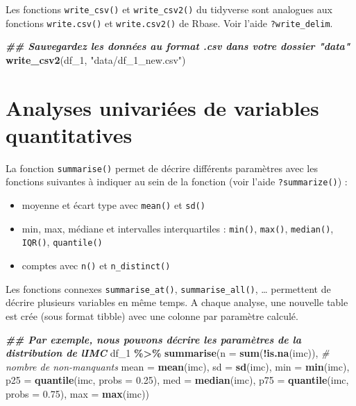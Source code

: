 \documentclass[
]{book}
\newenvironment{Shaded}{\begin{snugshade}}{\end{snugshade}}
\newcommand{\AttributeTok}[1]{\textcolor[rgb]{0.13,0.29,0.53}{#1}}
\newcommand{\CommentTok}[1]{\textcolor[rgb]{0.56,0.35,0.01}{\textit{#1}}}
\newcommand{\DocumentationTok}[1]{\textcolor[rgb]{0.56,0.35,0.01}{\textbf{\textit{#1}}}}
\newcommand{\FloatTok}[1]{\textcolor[rgb]{0.00,0.00,0.81}{#1}}
\newcommand{\FunctionTok}[1]{\textcolor[rgb]{0.13,0.29,0.53}{\textbf{#1}}}
\newcommand{\NormalTok}[1]{#1}
\newcommand{\SpecialCharTok}[1]{\textcolor[rgb]{0.81,0.36,0.00}{\textbf{#1}}}
\newcommand{\StringTok}[1]{\textcolor[rgb]{0.31,0.60,0.02}{#1}}
\providecommand{\tightlist}{%
  \setlength{\itemsep}{0pt}\setlength{\parskip}{0pt}}
\begin{document}
Les fonctions \texttt{write\_csv()} et \texttt{write\_csv2()} du tidyverse sont analogues aux fonctions \texttt{write.csv()} et \texttt{write.csv2()} de Rbase. Voir l'aide \texttt{?write\_delim}.

\begin{Shaded}
\begin{Highlighting}[]
\DocumentationTok{\#\# Sauvegardez les données au format .csv dans votre dossier "data"}
\FunctionTok{write\_csv2}\NormalTok{(df\_1, }\StringTok{"data/df\_1\_new.csv"}\NormalTok{) }
\end{Highlighting}
\end{Shaded}

\section{Analyses univariées de variables quantitatives}\label{analyses-univariuxe9es-de-variables-quantitatives}

La fonction \texttt{summarise()} permet de décrire différents paramètres avec les fonctions suivantes à indiquer au sein de la fonction (voir l'aide \texttt{?summarize()}) :

\begin{itemize}
\tightlist
\item
  moyenne et écart type avec \texttt{mean()} et \texttt{sd()}
\item
  min, max, médiane et intervalles interquartiles : \texttt{min()}, \texttt{max()}, \texttt{median()}, \texttt{IQR()}, \texttt{quantile()}
\item
  comptes avec \texttt{n()} et \texttt{n\_distinct()}
\end{itemize}

Les fonctions connexes \texttt{summarise\_at()}, \texttt{summarise\_all()}, \ldots{} permettent de décrire plusieurs variables en même temps. A chaque analyse, une nouvelle table est crée (sous format tibble) avec une colonne par paramètre calculé.

\begin{Shaded}
\begin{Highlighting}[]
\DocumentationTok{\#\# Par exemple, nous pouvons décrire les paramètres de la distribution de l\textquotesingle{}IMC }
\NormalTok{df\_1 }\SpecialCharTok{\%\textgreater{}\%} \FunctionTok{summarise}\NormalTok{(}\AttributeTok{n =} \FunctionTok{sum}\NormalTok{(}\SpecialCharTok{!}\FunctionTok{is.na}\NormalTok{(imc)), }\CommentTok{\# nombre de non{-}manquants}
                   \AttributeTok{mean =} \FunctionTok{mean}\NormalTok{(imc), }
                   \AttributeTok{sd =} \FunctionTok{sd}\NormalTok{(imc), }
                   \AttributeTok{min =} \FunctionTok{min}\NormalTok{(imc), }
                   \AttributeTok{p25 =} \FunctionTok{quantile}\NormalTok{(imc, }\AttributeTok{probs =} \FloatTok{0.25}\NormalTok{),}
                   \AttributeTok{med =} \FunctionTok{median}\NormalTok{(imc),}
                   \AttributeTok{p75 =} \FunctionTok{quantile}\NormalTok{(imc, }\AttributeTok{probs =} \FloatTok{0.75}\NormalTok{),}
                   \AttributeTok{max =} \FunctionTok{max}\NormalTok{(imc))}
\end{Highlighting}
\end{Shaded}
\end{document}
